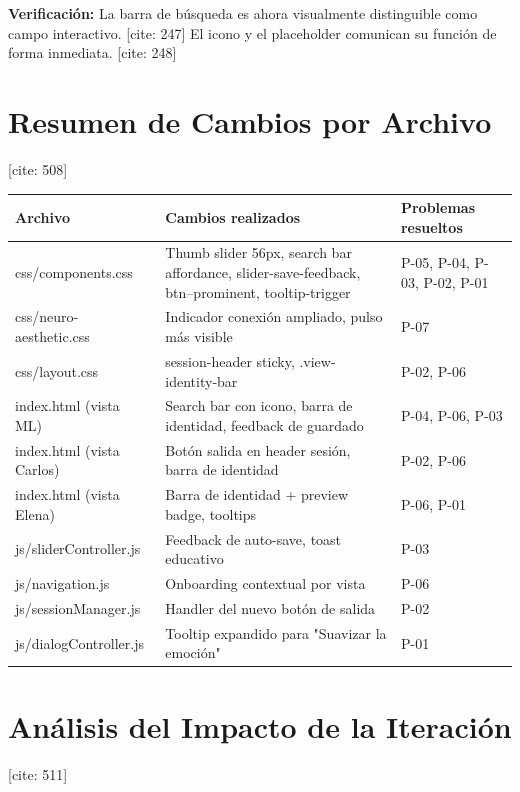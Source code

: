 \documentclass{article}
\begin{document}
\textbf{Verificación:} La barra de búsqueda es ahora visualmente distinguible como campo interactivo. [cite: 247] El icono y el placeholder comunican su función de forma inmediata. [cite: 248]

\section{Resumen de Cambios por Archivo} [cite: 508]

\begin{table}[h]
\centering
\begin{tabularx}{\textwidth}{lXl}
\toprule
\textbf{Archivo} & \textbf{Cambios realizados} & \textbf{Problemas resueltos} \\ [cite: 509]
\midrule
css/components.css & Thumb slider 56px, search bar affordance, slider-save-feedback, btn--prominent, tooltip-trigger & P-05, P-04, P-03, P-02, P-01 \\ [cite: 509]
css/neuro-aesthetic.css & Indicador conexión ampliado, pulso más visible & P-07 \\ [cite: 509]
css/layout.css & session-header sticky, .view-identity-bar & P-02, P-06 \\ [cite: 509]
index.html (vista ML) & Search bar con icono, barra de identidad, feedback de guardado & P-04, P-06, P-03 \\ [cite: 509]
index.html (vista Carlos) & Botón salida en header sesión, barra de identidad & P-02, P-06 \\ [cite: 509]
index.html (vista Elena) & Barra de identidad + preview badge, tooltips & P-06, P-01 \\ [cite: 510]
js/sliderController.js & Feedback de auto-save, toast educativo & P-03 \\ [cite: 510]
js/navigation.js & Onboarding contextual por vista & P-06 \\ [cite: 510]
js/sessionManager.js & Handler del nuevo botón de salida & P-02 \\ [cite: 510]
js/dialogController.js & Tooltip expandido para "Suavizar la emoción" & P-01 \\ [cite: 510]
\bottomrule
\end{tabularx}
\end{table}

\section{Análisis del Impacto de la Iteración} [cite: 511]
\end{document}
